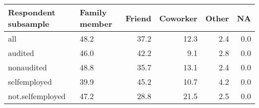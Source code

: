\begin{table}[ht]
\centering
\begin{tabular}{lL{2cm}rrrr}
  \hline
Respondent subsample & Family member & Friend & Coworker & Other & NA \\ 
  \hline
all & 48.2 & 37.2 & 12.3 & 2.4 & 0.0 \\ 
  audited & 46.0 & 42.2 & 9.1 & 2.8 & 0.0 \\ 
  nonaudited & 48.8 & 35.7 & 13.1 & 2.4 & 0.0 \\ 
  selfemployed & 39.9 & 45.2 & 10.7 & 4.2 & 0.0 \\ 
  not.selfemployed & 47.2 & 28.8 & 21.5 & 2.5 & 0.0 \\ 
   \hline
\end{tabular}
\end{table}
